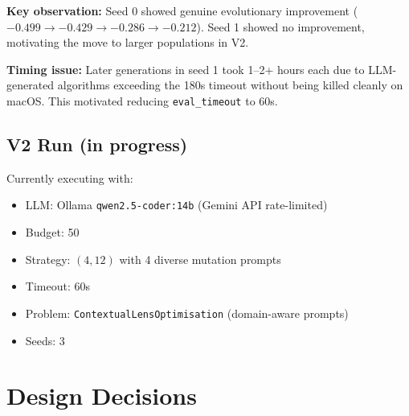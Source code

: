 \documentclass[a4paper,11pt]{article}
\begin{document}
\textbf{Key observation:} Seed 0 showed genuine evolutionary improvement
($-0.499 \to -0.429 \to -0.286 \to -0.212$). Seed 1 showed no improvement,
motivating the move to larger populations in V2.

\textbf{Timing issue:} Later generations in seed 1 took 1--2+ hours each due
to LLM-generated algorithms exceeding the 180s timeout without being killed
cleanly on macOS. This motivated reducing \texttt{eval\_timeout} to 60s.

\subsection{V2 Run (in progress)}

Currently executing with:
\begin{itemize}
    \item LLM: Ollama \texttt{qwen2.5-coder:14b} (Gemini API rate-limited)
    \item Budget: 50
    \item Strategy: $(4, 12)$ with 4 diverse mutation prompts
    \item Timeout: 60s
    \item Problem: \texttt{ContextualLensOptimisation} (domain-aware prompts)
    \item Seeds: 3
\end{itemize}

\section{Design Decisions}
\end{document}
